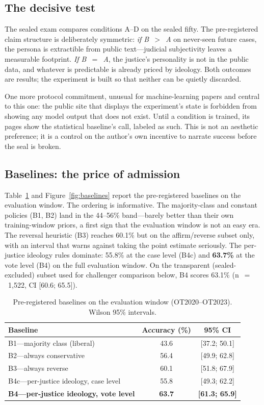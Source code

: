 \subsection{The decisive test}

The sealed exam compares conditions A--D on the sealed fifty. The
pre-registered claim structure is deliberately symmetric:
\emph{if B~$>$~A} on never-seen future cases, the persona is
extractible from public text---judicial subjectivity leaves a
measurable footprint. \emph{If B~$=$~A}, the justice's personality is
not in the public data, and whatever is predictable is already
priced by ideology. Both outcomes are results; the experiment is
built so that neither can be quietly discarded.

One more protocol commitment, unusual for machine-learning papers
and central to this one: the public site that displays the
experiment's state is forbidden from showing any model output that
does not exist. Until a condition is trained, its pages show the
statistical baseline's call, labeled as such. This is not an
aesthetic preference; it is a control on the author's own incentive
to narrate success before the seal is broken.

\subsection{Baselines: the price of admission}

Table~\ref{tab:baselines} and Figure~\ref{fig:baselines} report the
pre-registered baselines on the evaluation window. The ordering is
informative. The majority-class and constant policies (B1, B2) land
in the 44--56\% band---barely better than their own training-window
priors, a first sign that the evaluation window is not an easy era.
The reversal heuristic (B3) reaches 60.1\% but on the affirm/reverse
subset only, with an interval that warns against taking the point
estimate seriously. The per-justice ideology rules dominate: 55.8\%
at the case level (B4c) and \textbf{63.7\%} at the vote level (B4)
on the full evaluation window. On the transparent (sealed-excluded)
subset used for challenger comparison below, B4 scores 63.1\%
(n~$=$~1{,}522, CI [60.6; 65.5]).

\begin{table}[t]
\centering
\caption{Pre-registered baselines on the evaluation window
(OT2020--OT2023). Wilson 95\% intervals.}
\label{tab:baselines}
\small
\begin{tabular}{@{}lcc@{}}
\toprule
Baseline & Accuracy (\%) & 95\% CI \\
\midrule
B1---majority class (liberal) & 43.6 & [37.2; 50.1] \\
B2---always conservative & 56.4 & [49.9; 62.8] \\
B3---always reverse & 60.1 & [51.8; 67.9] \\
B4c---per-justice ideology, case level & 55.8 & [49.3; 62.2] \\
\textbf{B4---per-justice ideology, vote level} &
\textbf{63.7} & \textbf{[61.3; 65.9]} \\
\bottomrule
\end{tabular}
\end{table}

